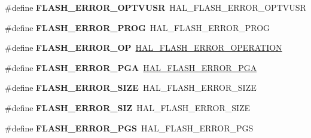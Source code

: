 \begin{DoxyCompactItemize}
\#define {\bfseries F\+L\+A\+S\+H\+\_\+\+E\+R\+R\+O\+R\+\_\+\+O\+P\+T\+V\+U\+SR}~H\+A\+L\+\_\+\+F\+L\+A\+S\+H\+\_\+\+E\+R\+R\+O\+R\+\_\+\+O\+P\+T\+V\+U\+SR
\item 
\mbox{\label{group___h_a_l___f_l_a_s_h___aliased___defines_ga737128e267cde11757448a999b907a7c}} 
\#define {\bfseries F\+L\+A\+S\+H\+\_\+\+E\+R\+R\+O\+R\+\_\+\+P\+R\+OG}~H\+A\+L\+\_\+\+F\+L\+A\+S\+H\+\_\+\+E\+R\+R\+O\+R\+\_\+\+P\+R\+OG
\item 
\mbox{\label{group___h_a_l___f_l_a_s_h___aliased___defines_ga7e6bf51847569d433bdb694bdb5ac0f7}} 
\#define {\bfseries F\+L\+A\+S\+H\+\_\+\+E\+R\+R\+O\+R\+\_\+\+OP}~\mbox{\hyperlink{group___f_l_a_s_h___error___code_gafa1433e0ca2366478928c04244310d44}{H\+A\+L\+\_\+\+F\+L\+A\+S\+H\+\_\+\+E\+R\+R\+O\+R\+\_\+\+O\+P\+E\+R\+A\+T\+I\+ON}}
\item 
\mbox{\label{group___h_a_l___f_l_a_s_h___aliased___defines_ga3e610cf7bc499ea0e7eee1380a04f42d}} 
\#define {\bfseries F\+L\+A\+S\+H\+\_\+\+E\+R\+R\+O\+R\+\_\+\+P\+GA}~\mbox{\hyperlink{group___f_l_a_s_h___error___code_gad9f62b6567543610f667bce580550662}{H\+A\+L\+\_\+\+F\+L\+A\+S\+H\+\_\+\+E\+R\+R\+O\+R\+\_\+\+P\+GA}}
\item 
\mbox{\label{group___h_a_l___f_l_a_s_h___aliased___defines_gac056ad0617d3beaf8cf2ffb0c87b7266}} 
\#define {\bfseries F\+L\+A\+S\+H\+\_\+\+E\+R\+R\+O\+R\+\_\+\+S\+I\+ZE}~H\+A\+L\+\_\+\+F\+L\+A\+S\+H\+\_\+\+E\+R\+R\+O\+R\+\_\+\+S\+I\+ZE
\item 
\mbox{\label{group___h_a_l___f_l_a_s_h___aliased___defines_gaaa959c347779d59952fcb60d15dbe2b0}} 
\#define {\bfseries F\+L\+A\+S\+H\+\_\+\+E\+R\+R\+O\+R\+\_\+\+S\+IZ}~H\+A\+L\+\_\+\+F\+L\+A\+S\+H\+\_\+\+E\+R\+R\+O\+R\+\_\+\+S\+I\+ZE
\item 
\mbox{\label{group___h_a_l___f_l_a_s_h___aliased___defines_ga578b6dd558f1d11d9791b3c63a61e14b}} 
\#define {\bfseries F\+L\+A\+S\+H\+\_\+\+E\+R\+R\+O\+R\+\_\+\+P\+GS}~H\+A\+L\+\_\+\+F\+L\+A\+S\+H\+\_\+\+E\+R\+R\+O\+R\+\_\+\+P\+GS
\item 

\end{DoxyCompactItemize}
